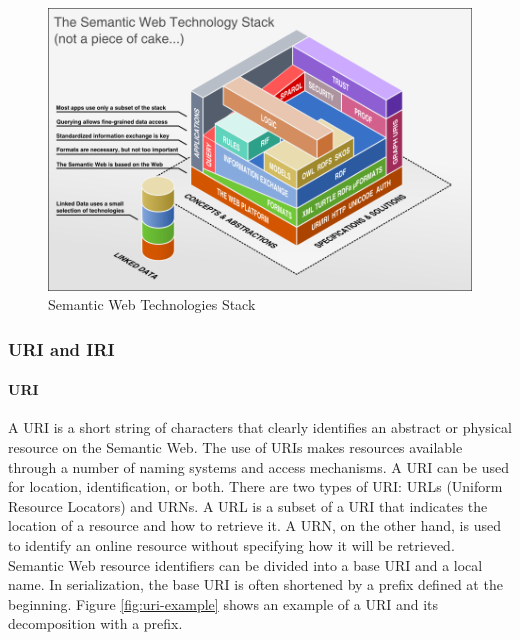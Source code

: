 \begin{figure}[H]
    \centering
    \includegraphics[scale=0.6]{images/foundation-sem-web-tech-stack.png}
    \caption{\label{fig:sem-web-stack} Semantic Web Technologies Stack }
\end{figure}


    \subsubsection{URI and IRI}
        \paragraph{URI}
        A URI is a short string of characters that clearly identifies an abstract or physical resource on the Semantic Web. The use of URIs makes resources available through a number of naming systems and access mechanisms. A URI can be used for location, identification, or both. There are two types of URI: URLs (Uniform Resource Locators) and URNs. A URL is a subset of a URI that indicates the location of a resource and how to retrieve it. A URN, on the other hand, is used to identify an online resource without specifying how it will be retrieved.\\

        Semantic Web resource identifiers can be divided into a base URI and a local name. In serialization, the base URI is often shortened by a prefix defined at the beginning. Figure \ref{fig:uri-example} shows an example of a URI and its decomposition with a prefix.\\

